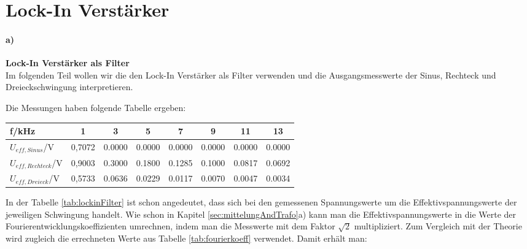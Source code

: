 
\section{Lock-In Verstärker}
\label{sec:lockin}

\paragraph{a)}\textbf{Lock-In Verstärker als Filter}\\
Im folgenden Teil wollen wir die den Lock-In Verstärker als Filter verwenden und die Ausgangsmesswerte der Sinus, Rechteck und Dreieckschwingung interpretieren.

Die Messungen haben folgende Tabelle ergeben:
\begin{center}
    \begin{tabular}{l | c c c c c c c}
        f/kHz               & 1 & 3 & 5 & 7 & 9 & 11 & 13 \\
        \hline
        $U_{eff,Sinus}$/V     & 0,7072 & 0.0000 & 0.0000 & 0.0000 & 0.0000 & 0.0000 & 0.0000 \\
        $U_{eff,Rechteck}$/V  & 0,9003 & 0.3000 & 0.1800 & 0.1285 & 0.1000 & 0.0817 & 0.0692 \\
        $U_{eff,Dreieck}$/V   & 0,5733 & 0.0636 & 0.0229 & 0.0117 & 0.0070 & 0.0047 & 0.0034 \\
    \end{tabular}
    \label{tab:lockinFilter}
\end{center}
In der Tabelle \ref{tab:lockinFilter} ist schon angedeutet, dass sich bei den gemessenen Spannungswerte um die Effektivspannungswerte der jeweiligen Schwingung handelt. Wie schon in Kapitel \ref{sec:mittelungAndTrafo}a) kann man die Effektivspannungswerte in die Werte der Fourierentwicklungskoeffizienten umrechnen, indem man die Messwerte mit dem Faktor $\sqrt{2}$ multipliziert. Zum Vergleich mit der Theorie wird zugleich die errechneten Werte aus Tabelle \ref{tab:fourierkoeff} verwendet. Damit erhält man:
